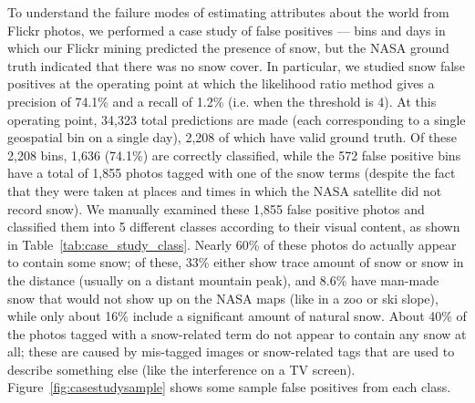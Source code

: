 To understand the failure modes of estimating attributes about the
world from Flickr photos, we performed a case study of false positives
--- bins and days in which our Flickr mining predicted the presence of
snow, but the NASA ground truth indicated that there was no snow
cover.  In particular, we studied snow false positives at the
operating point at which the likelihood ratio method gives a precision
of 74.1\% and a recall of 1.2\% (i.e. when the threshold is 4). At
this operating point, 34,323 total predictions are made (each
corresponding to a single geospatial bin on a single day), 2,208 of
which have valid ground truth.  Of these 2,208
bins, 1,636 (74.1\%) are correctly classified, while the 572 false
positive bins have a total of 1,855 photos tagged with one of the snow
terms (despite the fact that they were taken at places and times in
which the NASA satellite did not record snow).  We manually examined
these 1,855 false positive photos and classified them into 5 different
classes according to their visual content, as shown in
Table~\ref{tab:case_study_class}. Nearly 60\% of these photos do
actually appear to contain some snow; of these, 33\% either show trace
amount of snow or snow in the distance (usually on a distant mountain
peak), and 8.6\% have man-made snow that would not show up on the NASA
maps (like in a zoo or ski slope), while only about 16\% include a
significant amount of natural snow. About 40\% of the photos tagged
with a snow-related term do not appear to contain any snow at all; these
are caused by mis-tagged images or snow-related tags that are used to
describe something else (like the interference on a TV screen).
Figure~\ref{fig:casestudysample} shows some sample false positives from each class. 


